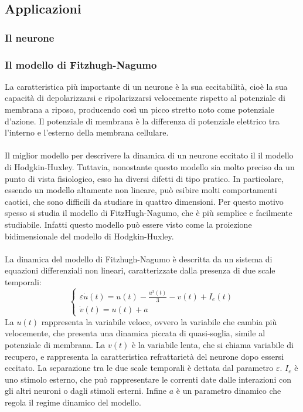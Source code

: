 \documentclass[12pt]{article}
\begin{document}
\subsection{Applicazioni}
\subsubsection{Il neurone \\}
\subsubsection{Il modello di Fitzhugh-Nagumo}
La caratteristica più importante di un neurone è la sua eccitabilità, cioè la sua capacità di depolarizzarsi e ripolarizzarsi velocemente rispetto al potenziale di membrana a riposo, producendo così un picco stretto noto come potenziale d'azione. Il potenziale di membrana è la differenza di potenziale elettrico tra l'interno e l'esterno della membrana cellulare. \\ \\
Il miglior modello per descrivere la dinamica di un neurone eccitato il il modello di Hodgkin-Huxley. Tuttavia, nonostante questo modello sia molto preciso da un punto di vista fisiologico, esso ha diversi difetti di tipo pratico. In particolare, essendo un modello altamente non lineare, può esibire molti comportamenti caotici, che sono difficili da studiare in quattro dimensioni. Per questo motivo spesso si studia il modello di FitzHugh-Nagumo, che è più semplice e facilmente studiabile. Infatti questo modello può essere visto come la proiezione bidimensionale del modello di Hodgkin-Huxley. \\ \\
La dinamica del modello di Fitzhugh-Nagumo è descritta da un sistema di equazioni differenziali non lineari, caratterizzate dalla presenza di due scale temporali:
\begin{equation}
	\begin{cases}
		\varepsilon\dot{u}(t) = u(t) - \frac{u^3(t)}{3}-v(t)+I_{e}(t) \\
		\dot{v}(t) = u(t) + a
	\end{cases}
\end{equation}
La $u(t)$ rappresenta la variabile veloce, ovvero la variabile che cambia più velocemente, che presenta una dinamica piccata di quasi-soglia, simile al potenziale di membrana. La $v(t)$ è la variabile lenta, che si chiama variabile di recupero, e rappresenta la caratteristica refrattarietà del neurone dopo essersi eccitato. La separazione tra le due scale temporali è dettata dal parametro $\varepsilon$. $I_e$ è uno stimolo esterno, che può rappresentare le correnti date dalle interazioni con gli altri neuroni o dagli stimoli esterni. Infine $a$ è un parametro dinamico che regola il regime dinamico del modello. \\ \\
\end{document}

